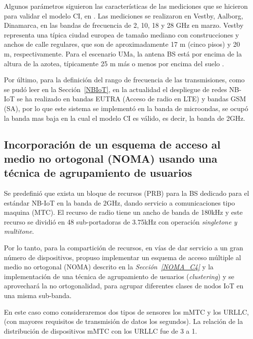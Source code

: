 Algunos parámetros siguieron las características de las mediciones que se hicieron para validar el modelo CI, en \parencite{Sun2016}. Las mediciones se realizaron en Vestby, Aalborg, Dinamarca, en las bandas de frecuencia de 2, 10, 18 y 28 GHz en marzo. Vestby representa una típica ciudad europea de tamaño mediano con construcciones y anchos de calle regulares, que son de aproximadamente 17 m (cinco pisos) y 20 m, respectivamente. Para el escenario UMa, la antena BS está por encima de la altura de la azotea, típicamente 25 m más o menos por encima del suelo \parencite{Sun2016}.\newline

Por último, para la definición del rango de frecuencia de las transmisiones, como se pudó leer en la Sección~\ref{NBIoT}, en la actualidad el despliegue de redes NB-IoT se ha realizado en bandas EUTRA (Acceso de radio en LTE) y bandas GSM (SA), por lo que este sistema se implementó en la banda de microondas, se ocupó la banda mas baja en la cual el modelo CI es válido, es decir, la banda de 2GHz.

\subsection{Incorporación de un esquema de acceso al medio no ortogonal (NOMA) usando una técnica de agrupamiento de usuarios}
Se predefinió que exista un bloque de recursos (PRB) para la BS dedicado para el estándar NB-IoT en la banda de 2GHz, dando servicio a comunicaciones tipo maquina (MTC). El recurso de radio tiene un ancho de banda de 180kHz y este recurso se dividió en 48 sub-portadoras de 3.75kHz con operación \textit{singletone y multitone}.\newline

Por lo tanto, para la compartición de recursos, en vías de dar servicio a un gran número de dispositivos, propuso implementar un esquema de acceso múltiple al medio no ortogonal (NOMA) descrito en la \textit{Sección~\ref{NOMA_C4}} y la implementación de una técnica de agrupamiento de usuarios (\textit{clustering}) y se aprovechará la no ortogonalidad, para agrupar diferentes clases de nodos IoT en una misma sub-banda.\newline

En este caso como consideraremos dos tipos de sensores los mMTC y los URLLC, (con mayores requisitos de transmisión de datos los segundos). La relación de la distribución de dispositivos mMTC con los URLLC fue de 3 a 1.\newline

